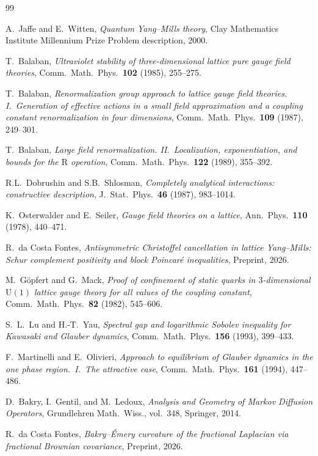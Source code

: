 \documentclass[11pt]{article}
\theoremstyle{definition}
\begin{document}
\begin{thebibliography}{99}

A.~Jaffe and E.~Witten,
\emph{Quantum Yang--Mills theory},
Clay Mathematics Institute Millennium Prize Problem description, 2000.

T.~Balaban,
\emph{Ultraviolet stability of three-dimensional lattice pure gauge field theories},
Comm.\ Math.\ Phys.\ \textbf{102} (1985), 255--275.

T.~Balaban,
\emph{Renormalization group approach to lattice gauge field theories.
I.\ Generation of effective actions in a small field approximation and a coupling constant renormalization in four dimensions},
Comm.\ Math.\ Phys.\ \textbf{109} (1987), 249--301.

T.~Balaban,
\emph{Large field renormalization. II.\ Localization, exponentiation, and bounds for the $\mathrm{R}$ operation},
Comm.\ Math.\ Phys.\ \textbf{122} (1989), 355--392.

R.L.~Dobrushin and S.B.~Shlosman,
\emph{Completely analytical interactions: constructive description},
J.\ Stat.\ Phys.\ \textbf{46} (1987), 983--1014.

K.~Osterwalder and E.~Seiler,
\emph{Gauge field theories on a lattice},
Ann.\ Phys.\ \textbf{110} (1978), 440--471.

R.~da Costa Fontes,
\emph{Antisymmetric Christoffel cancellation in lattice Yang--Mills:
Schur complement positivity and block Poincar\'e inequalities},
Preprint, 2026.

M.~G\"opfert and G.~Mack,
\emph{Proof of confinement of static quarks in $3$-dimensional $\mathrm{U}(1)$ 
lattice gauge theory for all values of the coupling constant},
Comm.\ Math.\ Phys.\ \textbf{82} (1982), 545--606.

S.~L.~Lu and H.-T.~Yau,
\emph{Spectral gap and logarithmic Sobolev inequality for Kawasaki 
and Glauber dynamics},
Comm.\ Math.\ Phys.\ \textbf{156} (1993), 399--433.

F.~Martinelli and E.~Olivieri,
\emph{Approach to equilibrium of Glauber dynamics in the one phase 
region.~I.~The attractive case},
Comm.\ Math.\ Phys.\ \textbf{161} (1994), 447--486.

D.~Bakry, I.~Gentil, and M.~Ledoux,
\emph{Analysis and Geometry of Markov Diffusion Operators},
Grundlehren Math.\ Wiss., vol.~348, Springer, 2014.

R.~da Costa Fontes,
\emph{Bakry--\'Emery curvature of the fractional Laplacian 
via fractional Brownian covariance},
Preprint, 2026.

\end{thebibliography}
\end{document}
